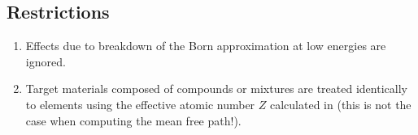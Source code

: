 \begin{bibunit}[unsrt]
\subsection{Restrictions}

\begin{enumerate}
\item
Effects due to breakdown of the Born approximation at low energies are ignored.
\item
Target materials composed of compounds or mixtures are treated identically
to elements using the effective atomic number $Z$ calculated in
(this is not the case when computing the mean free path!).
\end{enumerate}
\end{bibunit}


\setcounter{page}{1}%
\def\Rtnr{Index}%


